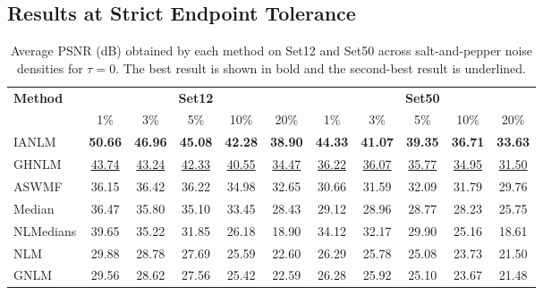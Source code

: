 \documentclass[pdflatex,iicol,sn-mathphys-num]{sn-jnl}
\newcommand{\method}{IANLM\xspace}
\newcommand{\ghnlm}{GHNLM\xspace}
\newcommand{\nlm}{NLM\xspace}
\newcommand{\gnlm}{GNLM\xspace}
\newcommand{\aswmf}{ASWMF\xspace}
\newcommand{\nlmedian}{NLMedians\xspace}
\begin{document}
\subsection{Results at Strict Endpoint Tolerance}
\label{subsec:results_tau0}
\begin{table}[!t]
  \centering
  \caption{Average PSNR (dB) obtained by each method on Set12 and Set50 across salt-and-pepper noise densities for $\tau=0$. The best result is shown in bold and the second-best result is underlined.}
  \label{tab:psnr_tau0_by_density}
  \scriptsize
  \setlength{\tabcolsep}{4pt}
  \renewcommand{\arraystretch}{1.12}
  \begin{tabular*}{\textwidth}{@{\extracolsep{\fill}}lccccc|ccccc}
  \toprule
  \multirow{2}{*}{\textbf{Method}} &
  \multicolumn{5}{c|}{\textbf{Set12}} &
  \multicolumn{5}{c}{\textbf{Set50}} \\
  \cmidrule(lr){2-6}\cmidrule(lr){7-11}
  & 1\% & 3\% & 5\% & 10\% & 20\%
  & 1\% & 3\% & 5\% & 10\% & 20\% \\
  \midrule
  \method   & \textbf{50.66} & \textbf{46.96} & \textbf{45.08} & \textbf{42.28} & \textbf{38.90}
            & \textbf{44.33} & \textbf{41.07} & \textbf{39.35} & \textbf{36.71} & \textbf{33.63} \\
  \ghnlm    & \underline{43.74} & \underline{43.24} & \underline{42.33} & \underline{40.55} & \underline{34.47}
            & \underline{36.22} & \underline{36.07} & \underline{35.77} & \underline{34.95} & \underline{31.50} \\
  \aswmf    & 36.15 & 36.42 & 36.22 & 34.98 & 32.65
            & 30.66 & 31.59 & 32.09 & 31.79 & 29.76 \\
  Median    & 36.47 & 35.80 & 35.10 & 33.45 & 28.43
            & 29.12 & 28.96 & 28.77 & 28.23 & 25.75 \\
  \nlmedian & 39.65 & 35.22 & 31.85 & 26.18 & 18.90
            & 34.12 & 32.17 & 29.90 & 25.16 & 18.61 \\
  \nlm      & 29.88 & 28.78 & 27.69 & 25.59 & 22.60
            & 26.29 & 25.78 & 25.08 & 23.73 & 21.50 \\
  \gnlm     & 29.56 & 28.62 & 27.56 & 25.42 & 22.59
            & 26.28 & 25.92 & 25.10 & 23.67 & 21.48 \\
  \bottomrule
  \end{tabular*}
\end{table}
\end{document}
